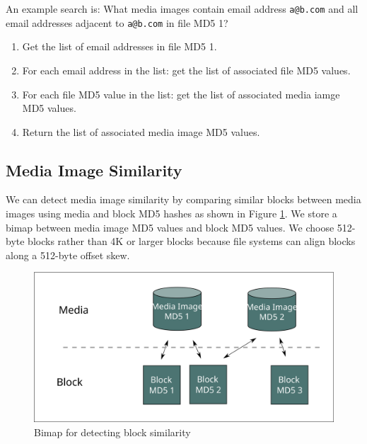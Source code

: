 \documentclass[12pt,twoside]{article}
\begin{document}
An example search is: What media images contain email address \verb+a@b.com+ and all email addresses adjacent to \verb+a@b.com+ in file MD5 1?

\begin{enumerate}
\item Get the list of email addresses in file MD5 1.
\item For each email address in the list: get the list of associated file MD5 values.
\item For each file MD5 value in the list: get the list of associated media iamge MD5 values.
\item Return the list of associated media image MD5 values.
\end{enumerate}

\subsection{Media Image Similarity}
We can detect media image similarity by comparing similar blocks between media images using media and block MD5 hashes as shown in Figure \ref{fig:blockSimilarity}.  We store a bimap between media image MD5 values and block MD5 values. We choose 512-byte blocks rather than 4K or larger blocks because file systems can align blocks along a 512-byte offset skew.

\begin{figure}
	\center
	\includegraphics[scale=.45]{block_similarity}
	\caption{Bimap for detecting block similarity}
	\label{fig:blockSimilarity}
\end{figure}
\end{document}
